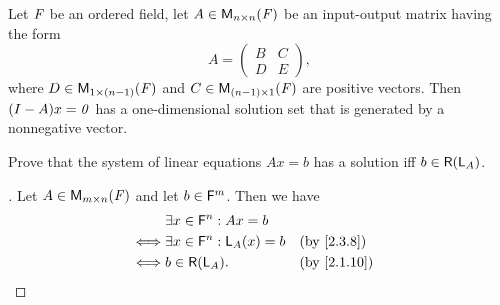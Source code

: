 \begin{thm}\label{3.12}
  Let \(\mathit{F}\) be an ordered field, let \(A \in \mathsf{M}_{{n} \times n}({\mathit{F}})\) be an input-output matrix having the form
  \[
    A = \begin{pmatrix}
      B & C \\
      D & E
    \end{pmatrix},
  \]
  where \(D \in \mathsf{M}_{{1} \times (n - 1)}({\mathit{F}})\) and \(C \in \mathsf{M}_{{(n - 1)} \times 1}({\mathit{F}})\) are positive vectors.
  Then \((I - A)x = \mathit{0}\) has a one-dimensional solution set that is generated by a nonnegative vector.
\end{thm}

\exercisesection

\setcounter{ex}{8}
\begin{ex}\label{ex:3.3.9}
  Prove that the system of linear equations \(Ax = b\) has a solution iff \(b \in \rg{\L_A}\).
\end{ex}

\begin{proof}[]
  Let \(A \in \mathsf{M}_{{m} \times n}({\mathit{F}})\) and let \(b \in \mathsf{F}^m\).
  Then we have
  \begin{align*}
         & \exists x \in \vs{F}^n : Ax = b                                     \\
    \iff & \exists x \in \vs{F}^n : \L_A(x) = b &  & \text{(by \cref{2.3.8})}  \\
    \iff & b \in \rg{\L_A}.                     &  & \text{(by \cref{2.1.10})}
  \end{align*}
\end{proof}
